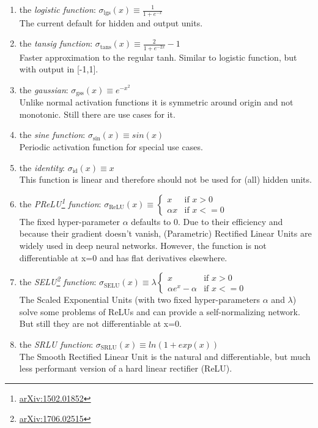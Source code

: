 \documentclass[11pt,a4paper,twoside]{article}
\newcommand{\logaf}{\sigma_{\text{lgs}}}
\newcommand{\tansaf}{\sigma_{\text{tans}}}
\newcommand{\gssaf}{\sigma_{\text{gss}}}
\newcommand{\sinaf}{\sigma_{\text{sin}}}
\newcommand{\idaf}{\sigma_{\text{id}}}
\newcommand{\reluaf}{\sigma_{\text{ReLU}}}
\newcommand{\seluaf}{\sigma_{\text{SELU}}}
\newcommand{\srluaf}{\sigma_{\text{SRLU}}}
\begin{document}
\begin{enumerate}
\item the \emph{logistic function}: $\logaf(x) \equiv \frac{1}{1+e^{-x}}$ \\
The current default for hidden and output units.
\item the \emph{tansig function}: $\tansaf(x) \equiv \frac{2}{1+e^{-2x}} - 1$ \\
Faster approximation to the regular tanh. Similar to logistic function, but with output in [-1,1].  
\item the \emph{gaussian}: $\gssaf(x) \equiv e^{-x^2}$ \\
Unlike normal activation functions it is symmetric around origin and not monotonic. Still there are use cases for it.
\item the \emph{sine function}: $\sinaf(x) \equiv sin(x)$ \\
Periodic activation function for special use cases.
\item the \emph{identity}: $\idaf(x) \equiv x$ \\
This function is linear and therefore should not be used for (all) hidden units.
\item the \emph{PReLU\footnote{\href{https://arxiv.org/abs/1502.01852}{arXiv:1502.01852}} function}: $\reluaf(x) \equiv 
\begin{cases}
  x & \text{if $x>0$} \\
  \alpha x & \text{if $x<=0$}
\end{cases}$ \\
The fixed hyper-parameter $\alpha$ defaults to 0. Due to their efficiency and because their gradient doesn't vanish, (Parametric) Rectified Linear Units are widely used in deep neural networks. However, the function is not differentiable at x=0 and has flat derivatives elsewhere. 
\item the \emph{SELU\footnote{\href{https://arxiv.org/abs/1706.02515}{arXiv:1706.02515}} function}: $\seluaf(x) \equiv \lambda 
\begin{cases}
  x & \text{if $x>0$} \\
  \alpha e^{x}- \alpha & \text{if $x<=0$}
\end{cases}$ \\
The Scaled Exponential Units (with two fixed hyper-parameters $\alpha$ and $\lambda$) solve some problems of ReLUs and can provide a self-normalizing network. But still they are not differentiable at x=0. 
\item the \emph{SRLU function}: $\srluaf(x) \equiv ln(1+exp(x))$ \\
The Smooth Rectified Linear Unit is the natural and differentiable, but much less performant version of a hard linear rectifier (ReLU).

\end{enumerate}
\end{document}
